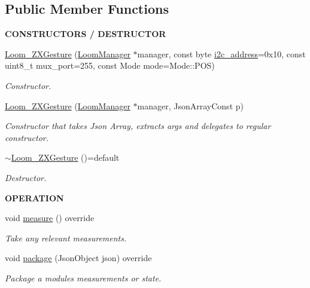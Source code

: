 \subsection*{Public Member Functions}
\begin{Indent}{\bf C\+O\+N\+S\+T\+R\+U\+C\+T\+O\+RS / D\+E\+S\+T\+R\+U\+C\+T\+OR}\par
\begin{DoxyCompactItemize}
\item 
\hyperlink{class_loom___z_x_gesture_ad69121d2a42277299765eb38656882e0}{Loom\+\_\+\+Z\+X\+Gesture} (\hyperlink{class_loom_manager}{Loom\+Manager} $\ast$manager, const byte \hyperlink{class_loom_i2_c_sensor_a6ff389c1f015152a9ebfccb037d3d90e}{i2c\+\_\+address}=0x10, const uint8\+\_\+t mux\+\_\+port=255, const Mode mode=\+Mode\+::\+P\+O\+S)
\begin{DoxyCompactList}\small\item\em Constructor. \end{DoxyCompactList}\item 
\hyperlink{class_loom___z_x_gesture_a4769782b6838cff67553d07a10ce7e75}{Loom\+\_\+\+Z\+X\+Gesture} (\hyperlink{class_loom_manager}{Loom\+Manager} $\ast$manager, Json\+Array\+Const p)
\begin{DoxyCompactList}\small\item\em Constructor that takes Json Array, extracts args and delegates to regular constructor. \end{DoxyCompactList}\item 
\hyperlink{class_loom___z_x_gesture_a82f97ae9ec9f2ba8da8f8e29b4f64159}{$\sim$\+Loom\+\_\+\+Z\+X\+Gesture} ()=default
\begin{DoxyCompactList}\small\item\em Destructor. \end{DoxyCompactList}\end{DoxyCompactItemize}
\end{Indent}
\begin{Indent}{\bf O\+P\+E\+R\+A\+T\+I\+ON}\par
\begin{DoxyCompactItemize}
\item 
void \hyperlink{class_loom___z_x_gesture_a2449b2c665d179dac470623322fe7c7b}{measure} () override
\begin{DoxyCompactList}\small\item\em Take any relevant measurements. \end{DoxyCompactList}\item 
void \hyperlink{class_loom___z_x_gesture_a48153345d472b3e5008c42ddb6f49223}{package} (Json\+Object json) override
\begin{DoxyCompactList}\small\item\em Package a modules measurements or state. \end{DoxyCompactList}\end{DoxyCompactItemize}
\end{Indent}
